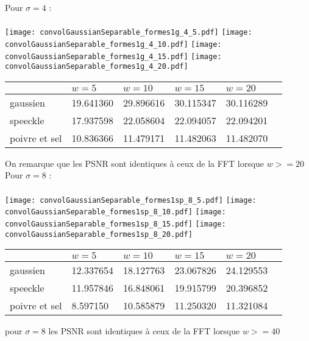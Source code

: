 \documentclass[12pt]{article}
\numberwithin{equation}{section}
\begin{document}
Pour $\sigma = 4$ :\\\\
\texttt{[image: convolGaussianSeparable\_formes1g\_4\_5.pdf]}
\texttt{[image: convolGaussianSeparable\_formes1g\_4\_10.pdf]}
\texttt{[image: convolGaussianSeparable\_formes1g\_4\_15.pdf]}
\texttt{[image: convolGaussianSeparable\_formes1g\_4\_20.pdf]}

\begin{center}
  \begin{tabular}{|l|l|l|l|l|l|}
    \hline
    & $w = 5$ & $w = 10$ & $w = 15$  & $w = 20$ \\
    \hline
    gaussien & 19.641360  & 29.896616  & 30.115347  & 30.116289\\
    \hline
    speeckle & 17.937598  & 22.058604  & 22.094057  & 22.094201\\
    \hline
    poivre et sel & 10.836366 & 11.479171 & 11.482063  & 11.482070\\
    \hline
  \end{tabular}
\end{center}
On remarque que les PSNR sont identiques à ceux de la FFT lorsque $w >= 20$\\

Pour $\sigma = 8$ : \\\\
\texttt{[image: convolGaussianSeparable\_formes1sp\_8\_5.pdf]}
\texttt{[image: convolGaussianSeparable\_formes1sp\_8\_10.pdf]}
\texttt{[image: convolGaussianSeparable\_formes1sp\_8\_15.pdf]}
\texttt{[image: convolGaussianSeparable\_formes1sp\_8\_20.pdf]}
\begin{center}
  \begin{tabular}{|l|l|l|l|l|l|}
    \hline
    & $w = 5$ & $w = 10$ & $w = 15$  & $w = 20$ \\
    \hline
    gaussien & 12.337654  & 18.127763   & 23.067826  & 24.129553\\
    \hline
    speeckle & 11.957846   & 16.848061  &  19.915799  & 20.396852 \\
    \hline
    poivre et sel & 8.597150  &  10.585879 & 11.250320  & 11.321084 \\
    \hline
  \end{tabular}
\end{center}
pour $\sigma = 8$ les PSNR sont identiques à ceux de la FFT lorsque $w >= 40$\\
\end{document}
